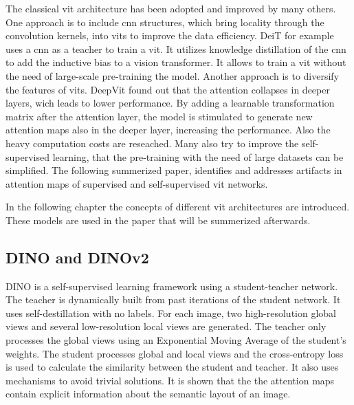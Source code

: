 \documentclass[conference]{IEEEtran}
\begin{document}
  The classical \ac{vit} architecture has been adopted and improved by many others. One approach is to include \ac{cnn} structures, which bring locality through the convolution kernels, into \acp{vit} to improve the data efficiency. DeiT \cite{deit} for example uses a \ac{cnn} as a teacher to train a \ac{vit}. It utilizes knowledge distillation of the \ac{cnn} to add the inductive bias to a vision transformer. It allows to train a \ac{vit} without the need of large-scale pre-training the model. \cite{vit-state-challenges} Another approach is to diversify the features of \acp{vit}. DeepVit \cite{deepvit} found out that the attention collapses in deeper layers, wich leads to lower performance. By adding a learnable transformation matrix after the attention layer, the model is stimulated to generate new attention maps also in the deeper layer, increasing the performance. \cite{vit-state-challenges} Also the heavy computation costs are reseached. Many also try to improve the self-supervised learning, that the pre-training with the need of large datasets can be simplified. \cite{vit-state-challenges} The following summerized paper, identifies and addresses artifacts in attention maps of supervised and self-supervised \ac{vit} networks.
  
  In the following chapter the concepts of different \ac{vit} architectures are introduced. These models are used in the paper \cite{registers} that will be summerized afterwards.

  \subsection{\mbox{DINO} and \mbox{DINOv2}}
  \label{sec:dino-dinov2}

  \mbox{DINO} is a self-supervised learning framework using a student-teacher network. The teacher is dynamically built from past iterations of the student network. It uses self-destillation with no labels. For each image, two high-resolution global views and several low-resolution local views are generated. The teacher only processes the global views using an Exponential Moving Average of the student's weights. The student processes global and local views and the cross-entropy loss is used to calculate the similarity between the student and teacher. It also uses mechanisms to avoid trivial solutions. \cite{dino} It is shown that the the attention maps contain explicit information about the semantic layout of an image. \cite{registers}
\end{document}
